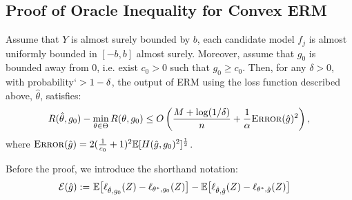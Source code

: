 \documentclass[12pt]{extarticle} %
\newcommand{\E}{\mathbb{E}}
\newcommand{\error}{\ensuremath{\textsc{Error}}}
\begin{document}
\subsection{Proof of Oracle Inequality for Convex ERM}
\begin{theorem}\label{convex-erm}
Assume that $Y$ is almost surely bounded by $b$, each candidate model $f_j$ is almost uniformly bounded in $[-b,b]$ almost surely. Moreover, assume that $g_0$ is bounded away from 0, i.e. exist $c_0>0$ such that $g_0\geq c_0$. Then, for any $\delta>0$, with probability$`>1-\delta$, the output of ERM using the loss function described above, $\hat{\theta}$, satisfies:
\begin{align*}
    R(\hat{\theta},g_0) - \min_{\theta\in\Theta}R(\theta,g_0) \leq O\left(\frac{M+\log(1/\delta)}{n} + \frac{1}{\alpha}\error(\hat{g})^2\right),
\end{align*} 
where $\error(\hat{g}) = 2(\frac{1}{c_0}+1)^2\E[H(\hat{g},g_0)^2]^\frac{1}{2}$. 
\end{theorem}

Before the proof, we introduce the shorthand notation:
\begin{align*}
    {\cal E}(\hat{g}) :=~& \E\big[{\ell}_{\hat{\theta},g_0}(Z) - {\ell}_{\theta^*,g_0}(Z)\big] - \E\big[{\ell}_{\hat{\theta},\hat{g}}(Z) - {\ell}_{\theta^*,\hat{g}}(Z)\big]
\end{align*}
\end{document}
